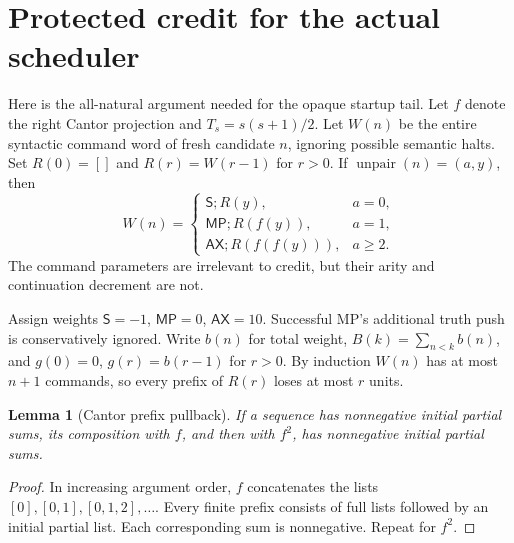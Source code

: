 \documentclass[11pt]{article}
\newtheorem{lemma}[theorem]{Lemma}
\newcommand{\AX}{\mathsf{AX}}
\newcommand{\MP}{\mathsf{MP}}
\newcommand{\Tr}{\mathsf S}
\begin{document}
\section{Protected credit for the actual scheduler}
\label{sec:credit}

Here is the all-natural argument needed for the opaque startup
tail. Let $f$ denote the right Cantor projection and
$T_s=s(s+1)/2$. Let $W(n)$ be the entire syntactic command
word of fresh candidate $n$, ignoring possible semantic halts.
Set $R(0)=[]$ and $R(r)=W(r-1)$ for $r>0$. If
$\operatorname{unpair}(n)=(a,y)$, then
\begin{equation}
 W(n)=
 \begin{cases}
 \Tr;R(y),&a=0,\\
 \MP;R(f(y)),&a=1,\\
 \AX;R(f(f(y))),&a\ge2.
 \end{cases}
 \label{eq:schedule}
\end{equation}
The command parameters are irrelevant to credit, but their
arity and continuation decrement are not.

Assign weights $\Tr=-1$, $\MP=0$, $\AX=10$.
Successful MP's additional truth push is conservatively
ignored. Write $b(n)$ for total weight,
$B(k)=\sum_{n<k}b(n)$, and
$g(0)=0$, $g(r)=b(r-1)$ for $r>0$.
By induction $W(n)$ has at most $n+1$ commands, so every
prefix of $R(r)$ loses at most $r$ units.

\begin{lemma}[Cantor prefix pullback]
If a sequence has nonnegative initial partial sums, its
composition with $f$, and then with $f^2$, has nonnegative
initial partial sums.
\end{lemma}
\begin{proof}
In increasing argument order, $f$ concatenates the lists
$[0],[0,1],[0,1,2],\ldots$. Every finite prefix consists of
full lists followed by an initial partial list. Each
corresponding sum is nonnegative. Repeat for $f^2$.
\end{proof}
\end{document}
